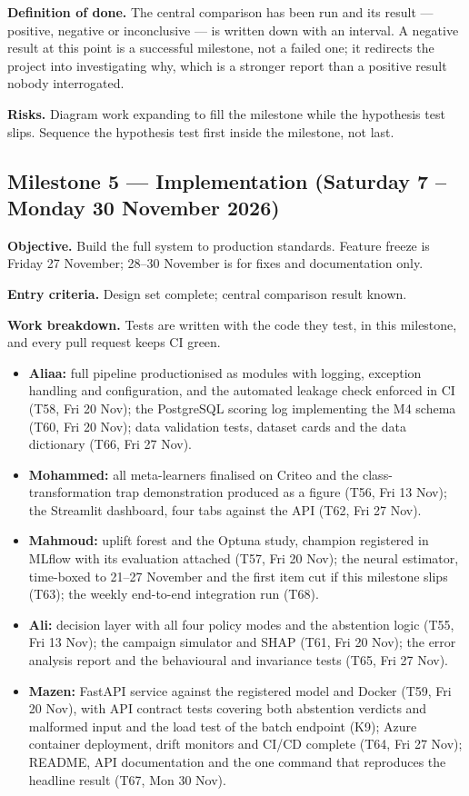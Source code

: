 \documentclass[11pt,a4paper]{article}
\begin{document}
\textbf{Definition of done.} The central comparison has been run and its result --- positive,
negative or inconclusive --- is written down with an interval. A negative result at this point is a
successful milestone, not a failed one; it redirects the project into investigating why, which is a
stronger report than a positive result nobody interrogated.

\textbf{Risks.} Diagram work expanding to fill the milestone while the hypothesis test slips.
Sequence the hypothesis test first inside the milestone, not last.

\subsection{Milestone 5 --- Implementation (Saturday 7 -- Monday 30 November 2026)}

\textbf{Objective.} Build the full system to production standards. Feature freeze is Friday
27 November; 28--30 November is for fixes and documentation only.

\textbf{Entry criteria.} Design set complete; central comparison result known.

\textbf{Work breakdown.} Tests are written with the code they test, in this milestone, and every
pull request keeps CI green.
\begin{itemize}
\item \textbf{Aliaa:} full pipeline productionised as modules with logging, exception handling
and configuration, and the automated leakage check enforced in CI (T58, Fri 20 Nov); the
PostgreSQL scoring log implementing the M4 schema (T60, Fri 20 Nov); data validation tests,
dataset cards and the data dictionary (T66, Fri 27 Nov).
\item \textbf{Mohammed:} all meta-learners finalised on Criteo and the class-transformation trap
demonstration produced as a figure (T56, Fri 13 Nov); the Streamlit dashboard, four tabs against
the API (T62, Fri 27 Nov).
\item \textbf{Mahmoud:} uplift forest and the Optuna study, champion registered in MLflow with its
evaluation attached (T57, Fri 20 Nov); the neural estimator, time-boxed to 21--27 November and
the first item cut if this milestone slips (T63); the weekly end-to-end integration run (T68).
\item \textbf{Ali:} decision layer with all four policy modes and the abstention logic (T55,
Fri 13 Nov); the campaign simulator and SHAP (T61, Fri 20 Nov); the error analysis report and the
behavioural and invariance tests (T65, Fri 27 Nov).
\item \textbf{Mazen:} FastAPI service against the registered model and Docker (T59, Fri 20 Nov),
with API contract tests covering both abstention verdicts and malformed input and the load test
of the batch endpoint (K9); Azure container
deployment, drift monitors and CI/CD complete (T64, Fri 27 Nov); README, API documentation and
the one command that reproduces the headline result (T67, Mon 30 Nov).
\end{itemize}
\end{document}
